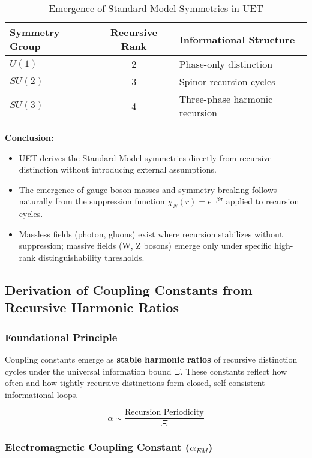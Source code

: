 \documentclass[12pt,a4paper]{article}
\begin{document}
\begin{table}[h]
\centering
\begin{tabular}{|l|c|l|}
\hline
\textbf{Symmetry Group} & \textbf{Recursive Rank} & \textbf{Informational Structure} \\
\hline
\(U(1)\) & 2 & Phase-only distinction \\
\(SU(2)\) & 3 & Spinor recursion cycles \\
\(SU(3)\) & 4 & Three-phase harmonic recursion \\
\hline
\end{tabular}
\caption{Emergence of Standard Model Symmetries in UET}
\end{table}

\textbf{Conclusion:}
\begin{itemize}
    \item UET derives the Standard Model symmetries directly from recursive distinction without introducing external assumptions.
    \item The emergence of gauge boson masses and symmetry breaking follows naturally from the suppression function \(\chi_N(r) = e^{-\beta \sigma}\) applied to recursion cycles.
    \item Massless fields (photon, gluons) exist where recursion stabilizes without suppression; massive fields (W, Z bosons) emerge only under specific high-rank distinguishability thresholds.
\end{itemize}
\subsection{Derivation of Coupling Constants from Recursive Harmonic Ratios}

\subsubsection*{Foundational Principle}

Coupling constants emerge as \textbf{stable harmonic ratios} of recursive distinction cycles under the universal information bound \(\Xi\). These constants reflect how often and how tightly recursive distinctions form closed, self-consistent informational loops.

\[
\alpha \sim \frac{\text{Recursion Periodicity}}{\Xi}
\]

\subsubsection*{Electromagnetic Coupling Constant (\(\alpha_{EM}\))}
\end{document}
